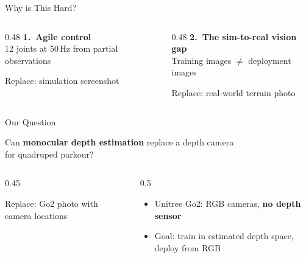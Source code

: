 \documentclass[aspectratio=169,10pt]{beamer}
\newcommand{\placeholder}[2][0.7\textheight]{%
  \begin{center}
    \colorbox{gray!12}{%
      \parbox{0.85\linewidth}{\centering\vspace{#1}%
        {\small\color{gray!60}#2}%
        \vspace{#1}}%
    }%
  \end{center}
}
\begin{document}
\begin{frame}{Why is This Hard?}

\begin{columns}[T]
\begin{column}{0.48\linewidth}
  \textbf{1.~Agile control}\\[4pt]
  12 joints at 50\,Hz from partial observations

  \vspace{8pt}
  \placeholder[0.15\textheight]{Replace: simulation screenshot}
\end{column}
\begin{column}{0.48\linewidth}
  \textbf{2.~The sim-to-real vision gap}\\[4pt]
  Training images $\neq$ deployment images

  \vspace{8pt}
  \placeholder[0.15\textheight]{Replace: real-world terrain photo}
\end{column}
\end{columns}

\end{frame}

\begin{frame}{Our Question}

\begin{center}
\Large Can \textbf{monocular depth estimation} replace a depth camera\\
for quadruped parkour?
\end{center}

\vspace{10pt}

\begin{columns}[c]
\begin{column}{0.45\linewidth}
  \placeholder[0.15\textheight]{Replace: Go2 photo with camera locations}
\end{column}
\begin{column}{0.5\linewidth}
  \begin{itemize}
    \item Unitree Go2: RGB cameras, \textbf{no depth sensor}
    \item Goal: train in estimated depth space, deploy from RGB
  \end{itemize}
\end{column}
\end{columns}

\end{frame}
\end{document}
